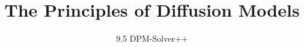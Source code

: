﻿%

\title{The Principles of Diffusion Models}
\subtitle{9.5 DPM-Solver++}


\begin{frame}
    \titlepage
\end{frame}


